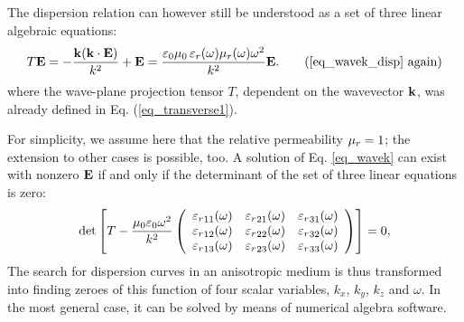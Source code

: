 The dispersion relation can however still be understood \cite[pp. 667]{born1999book} as a set of three linear algebraic equations:
\begin{equation}  T\E =  -\frac{\kk (\kk \cdot \E)}{k^2} + \E            = \frac{\varepsilon_0 \mu_0 \, \epsrl(\omega) \murl(\omega) \omega^{2}}{k^2} \E. \tag{\ref{eq_wavek_disp} \again}\end{equation}
where the wave-plane projection tensor $T$, dependent on the wavevector ${\mathbf{k}}$, was already defined in Eq. (\ref{eq_transverse1}).

For simplicity, we assume here that the relative permeability $\mu_r = 1$; the extension to other cases is possible, too. %
A solution of Eq. \ref{eq_wavek} can exist with nonzero $\mathbf{E}$ if and only if the determinant of the set of three linear equations is zero:
\begin{equation} 
\det\left[
T -
	\frac{\mu_0 \varepsilon_0 \omega^2}{k^2}
	\left(\begin{array}{ccc} 
	{\varepsilon_r}_{11}(\omega) & {\varepsilon_r}_{21}(\omega) & {\varepsilon_r}_{31}(\omega)  \\
	{\varepsilon_r}_{12}(\omega) & {\varepsilon_r}_{22}(\omega) & {\varepsilon_r}_{32}(\omega)  \\
	{\varepsilon_r}_{13}(\omega) & {\varepsilon_r}_{23}(\omega) & {\varepsilon_r}_{33}(\omega)  
	\end{array} \right) \right] = 0, \label{eq_dispdet}\end{equation}
The search for dispersion curves in an anisotropic medium is thus transformed into finding zeroes of this function of four scalar variables, $k_x$, $k_y$, $k_z$ and $\omega$.
In the most general case, it can be solved by means of numerical algebra software. 

